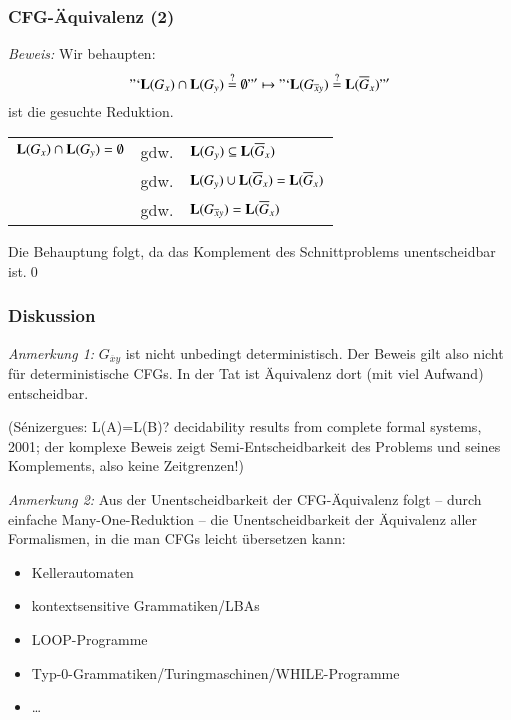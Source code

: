 \documentclass[onlymath]{beamer}
\begin{document}
\begin{frame}[t]\frametitle{CFG-Äquivalenz (2)}


\emph{Beweis:} Wir behaupten: \["`\textbf{\textcolor{black}{L}}(G_x)\cap\textbf{\textcolor{black}{L}}(G_y)\stackrel{?}{=}\emptyset"' \mapsto "`\textbf{\textcolor{black}{L}}(G_{\overline{x}y})\stackrel{?}{=}\textbf{\textcolor{black}{L}}(\overline{G}_x)"'\] ist die gesuchte Reduktion.\bigskip\pause

\begin{tabular}{rrl}
$\textbf{\textcolor{black}{L}}(G_x)\cap\textbf{\textcolor{black}{L}}(G_y)=\emptyset$ \pause
	& gdw. & $\textbf{\textcolor{black}{L}}(G_y)\subseteq\textbf{\textcolor{black}{L}}(\overline{G}_x)$\\\pause
	& gdw. & $\textbf{\textcolor{black}{L}}(G_y)\cup\textbf{\textcolor{black}{L}}(\overline{G}_x)=\textbf{\textcolor{black}{L}}(\overline{G}_x)$\\\pause
	& gdw. & $\textbf{\textcolor{black}{L}}(G_{\overline{x}y})=\textbf{\textcolor{black}{L}}(\overline{G}_x)$\\[1ex]
\end{tabular}

Die Behauptung folgt, da das Komplement des Schnittproblems unentscheidbar ist.\qed

\end{frame}

\begin{frame}\frametitle{Diskussion}

\emph{Anmerkung 1:} $G_{\overline{x}y}$ ist nicht unbedingt deterministisch. Der Beweis
gilt also nicht für deterministische CFGs. In der Tat ist Äquivalenz dort (mit viel Aufwand) entscheidbar.\\[1ex]
{\tiny (S\'{e}nizergues: L(A)=L(B)? decidability results from complete formal systems, 2001; der komplexe Beweis zeigt Semi-Entscheidbarkeit des Problems und seines Komplements, also keine Zeitgrenzen!)

}
\bigskip\pause

\emph{Anmerkung 2:} Aus der Unentscheidbarkeit der CFG-Äquivalenz folgt -- durch einfache Many-One-Reduktion -- die Unentscheidbarkeit der Äquivalenz aller Formalismen, in die man CFGs leicht übersetzen kann:
\begin{itemize}
\item Kellerautomaten
\item kontextsensitive Grammatiken/LBAs
\item LOOP-Programme
\item Typ-0-Grammatiken/Turingmaschinen/WHILE-Programme
\item \ldots
\end{itemize}

\end{frame}
\end{document}
